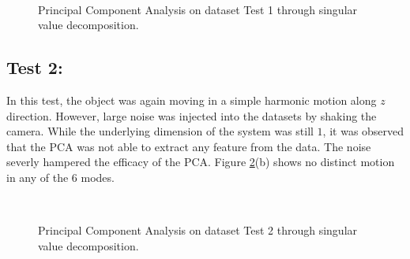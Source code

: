 \documentclass{article}
\begin{document}
\begin{figure}[!b]
\\
\caption{Principal Component Analysis on dataset Test 1 through singular value decomposition.}
\label{fig:test1}
\end{figure}

\subsection{Test 2:}
In this test, the object was again moving in a simple harmonic motion along $z$ direction. However, large noise was injected into the datasets by shaking the camera. While the underlying dimension of the system was still $1$, it was observed that the PCA was not able to extract any feature from the data. The noise severly hampered the efficacy of the PCA. Figure \ref{fig:test2}(b) shows no distinct motion in any of the $6$ modes. 

\begin{figure}[!b]
\\
\caption{Principal Component Analysis on dataset Test 2 through singular value decomposition.}
\label{fig:test2}
\end{figure}
\end{document}
